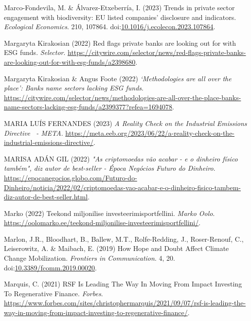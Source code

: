\documentclass[
  letterpaper,
  DIV=11,
  numbers=noendperiod]{scrartcl}
\newlength{\cslhangindent}
\newenvironment{CSLReferences}[2] %
 {\begin{list}{}{%
  \setlength{\itemindent}{0pt}
  \setlength{\leftmargin}{0pt}
  \setlength{\parsep}{0pt}
  \ifodd #1
   \setlength{\leftmargin}{\cslhangindent}
   \setlength{\itemindent}{-1\cslhangindent}
  \fi
  \setlength{\itemsep}{#2\baselineskip}}}
 {\end{list}}
\begin{document}
\begin{CSLReferences}{0}{1}
Marco-Fondevila, M. \& Álvarez-Etxeberría, I. (2023) Trends in private
sector engagement with biodiversity: {EU} listed companies' disclosure
and indicators. \emph{Ecological Economics}. 210, 107864.
doi:\href{https://doi.org/10.1016/j.ecolecon.2023.107864}{10.1016/j.ecolecon.2023.107864}.

Margaryta Kirakosian (2022) Red flags private banks are looking out for
with {ESG} funds. \emph{Selector}.
\url{https://citywire.com/selector/news/red-flags-private-banks-are-looking-out-for-with-esg-funds/a2398680}.

Margaryta Kirakosian \& Angus Foote (2022) \emph{{`{Methodologies} are
all over the place'}: {Banks} name sectors lacking {ESG} funds}.
\url{https://citywire.com/selector/news/methodologies-are-all-over-the-place-banks-name-sectors-lacking-esg-funds/a2399377?refea=1694078}.

MARIA LUÍS FERNANDES (2023) \emph{A {Reality Check} on the {Industrial
Emissions Directive}~ - {META}}.
\url{https://meta.eeb.org/2023/06/22/a-reality-check-on-the-industrial-emissions-directive/}.

MARISA ADÁN GIL (2022) \emph{"{As} criptomoedas v{ã}o acabar - e o
dinheiro f{í}sico tamb{é}m", diz autor de best-seller - {{É}poca
Neg{ó}cios} {\textbar} {Futuro} do {Dinheiro}}.
\url{https://epocanegocios.globo.com/Futuro-do-Dinheiro/noticia/2022/02/criptomoedas-vao-acabar-e-o-dinheiro-fisico-tambem-diz-autor-de-best-seller.html}.

Marko (2022) Teekond miljonilise investeerimisportfellini. \emph{Marko
Oolo}.
\url{https://oolomarko.ee/teekond-miljonilise-investeerimisportfellini/}.

Marlon, J.R., Bloodhart, B., Ballew, M.T., Rolfe-Redding, J.,
Roser-Renouf, C., Leiserowitz, A. \& Maibach, E. (2019) How {Hope} and
{Doubt Affect Climate Change Mobilization}. \emph{Frontiers in
Communication}. 4, 20.
doi:\href{https://doi.org/10.3389/fcomm.2019.00020}{10.3389/fcomm.2019.00020}.

Marquis, C. (2021) {RSF Is Leading The Way In Moving From Impact
Investing To Regenerative Finance}. \emph{Forbes}.
\url{https://www.forbes.com/sites/christophermarquis/2021/09/07/rsf-is-leading-the-way-in-moving-from-impact-investing-to-regenerative-finance/}.


\end{CSLReferences}
\end{document}
